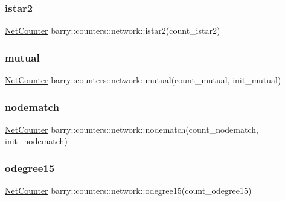 \subsubsection{\texorpdfstring{istar2}{istar2}}
{\footnotesize\ttfamily \hyperlink{namespacebarry_1_1counters_1_1network_a2d14cbc0a77bfba218df85a750bfeb84}{Net\+Counter} barry\+::counters\+::network\+::istar2(count\+\_\+istar2)}

\mbox{\label{namespacebarry_1_1counters_1_1network_a6df86b773f8b0ff358e8988122562a28}} 
\subsubsection{\texorpdfstring{mutual}{mutual}}
{\footnotesize\ttfamily \hyperlink{namespacebarry_1_1counters_1_1network_a2d14cbc0a77bfba218df85a750bfeb84}{Net\+Counter} barry\+::counters\+::network\+::mutual(count\+\_\+mutual, init\+\_\+mutual)}

\mbox{\label{namespacebarry_1_1counters_1_1network_a2903bd8cf46b7c8b72d49c92dd52c8ae}} 
\subsubsection{\texorpdfstring{nodematch}{nodematch}}
{\footnotesize\ttfamily \hyperlink{namespacebarry_1_1counters_1_1network_a2d14cbc0a77bfba218df85a750bfeb84}{Net\+Counter} barry\+::counters\+::network\+::nodematch(count\+\_\+nodematch, init\+\_\+nodematch)}

\mbox{\label{namespacebarry_1_1counters_1_1network_ac204cfc5dd18deb85d71dec056edfc16}} 
\subsubsection{\texorpdfstring{odegree15}{odegree15}}
{\footnotesize\ttfamily \hyperlink{namespacebarry_1_1counters_1_1network_a2d14cbc0a77bfba218df85a750bfeb84}{Net\+Counter} barry\+::counters\+::network\+::odegree15(count\+\_\+odegree15)}

